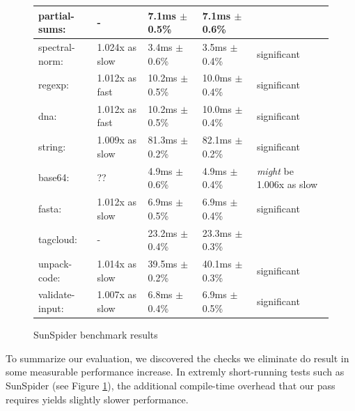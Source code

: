 \documentclass{article}
\begin{document}
\begin{figure}[H]
\begin{center}
\begin{tabular}{|l|l|l|l|l|}
\hline\hspace{0.5em} partial-sums:      & -                &   7.1ms $\pm$ 0.5\% &    7.1ms $\pm$ 0.6\% & \\
\hline\hspace{0.5em} spectral-norm:     & 1.024x as slow &   3.4ms $\pm$ 0.6\% &    3.5ms $\pm$ 0.4\%   &  significant \\
\hline\hline
regexp:              & 1.012x as fast   &  10.2ms $\pm$ 0.5\% &   10.0ms $\pm$ 0.4\%   &  significant \\
\hline\hspace{0.5em} dna:               & 1.012x as fast   &  10.2ms $\pm$ 0.5\% &   10.0ms $\pm$ 0.4\%   &  significant \\
\hline\hline
string:              & 1.009x as slow &  81.3ms $\pm$ 0.2\% &   82.1ms $\pm$ 0.2\%   &  significant \\
\hline\hspace{0.5em} base64:            & ??               &   4.9ms $\pm$ 0.6\% &    4.9ms $\pm$ 0.4\%   &  \textit{might} be 1.006x as slow \\
\hline\hspace{0.5em} fasta:             & 1.012x as slow &   6.9ms $\pm$ 0.5\% &    6.9ms $\pm$ 0.4\%   &  significant \\
\hline\hspace{0.5em} tagcloud:          & -                &  23.2ms $\pm$ 0.4\% &   23.3ms $\pm$ 0.3\% & \\
\hline\hspace{0.5em} unpack-code:       & 1.014x as slow &  39.5ms $\pm$ 0.2\% &   40.1ms $\pm$ 0.3\%   &  significant \\
\hline\hspace{0.5em} validate-input:    & 1.007x as slow &   6.8ms $\pm$ 0.4\% &    6.9ms $\pm$ 0.5\%   &  significant  \\
\hline
\end{tabular}
\caption{SunSpider benchmark results}
\label{fig:sunspider}
\end{center}
\end{figure}


To summarize our evaluation, we discovered the checks we eliminate do result in
some measurable performance increase. In extremly short-running tests such as
SunSpider (see Figure \ref{fig:sunspider}), the additional compile-time
overhead that our pass requires yields slightly slower performance.

\end{document}
